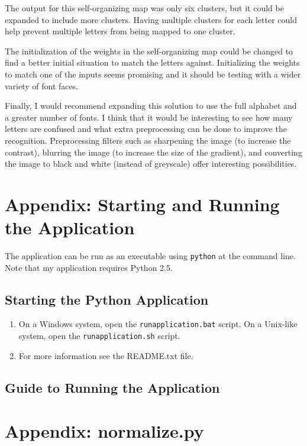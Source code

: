 \documentclass[12pt,letterpaper,oneside]{report}
\newcommand \code[1]{\texttt{#1}}
\begin{document}
The output for this self-organizing map was only six clusters, but it could be expanded to include more clusters. Having multiple clusters for each letter could help prevent multiple letters from being mapped to one cluster.

The initialization of the weights in the self-organizing map could be changed to find a better initial situation to match the letters against. Initializing the weights to match one of the inputs seems promising and it should be testing with a wider variety of font faces.

Finally, I would recommend expanding this solution to use the full alphabet and a greater number of fonts. I think that it would be interesting to see how many letters are confused and what extra preprocessing can be done to improve the recognition. Preprocessing filters such as sharpening the image (to increase the contrast), blurring the image (to increase the size of the gradient), and converting the image to black and white (instead of greyscale) offer interesting possibilities.

\clearpage
\section{Appendix: Starting and Running the Application}\label{apx:running}
The application can be run as an executable using \texttt{python} at the command line.
Note that my application requires Python 2.5.

\subsection{Starting the Python Application}
\begin{enumerate}
  \item On a Windows system, open the \code{runapplication.bat} script. On a
      Unix-like system, open the \code{runapplication.sh} script.
  \item For more information see the README.txt file.
\end{enumerate}

\subsection{Guide to Running the Application}

\section{Appendix: normalize.py}\label{apx:running}

%
\end{document}
